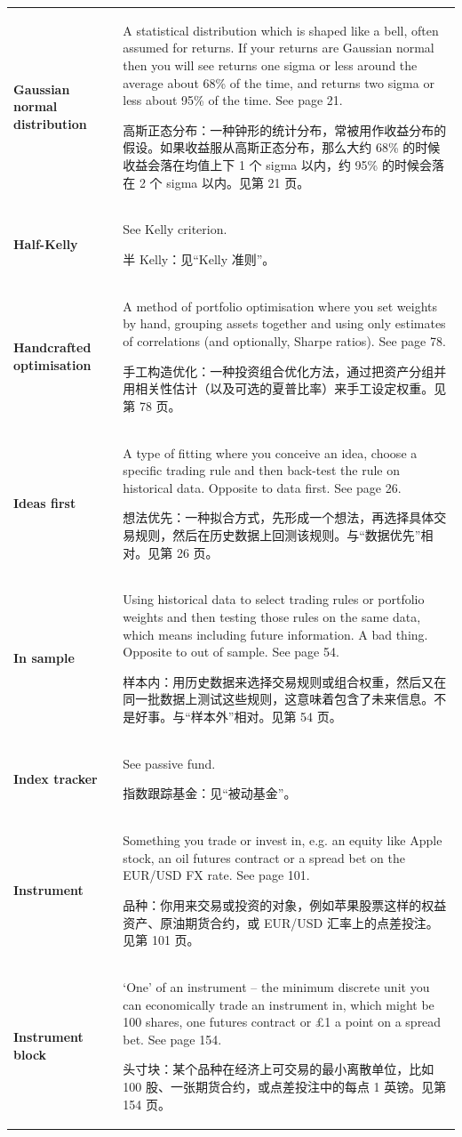 \begin{chinesetableblock}
{\begin{longtable}{@{}>{\raggedright\arraybackslash\bfseries} p{}>{\raggedright\arraybackslash} p{}@{}}
Gaussian normal distribution & A statistical distribution which is shaped like a bell, often assumed for returns. If your returns are Gaussian normal then you will see returns one sigma or less around the average about 68\% of the time, and returns two sigma or less about 95\% of the time. See page 21. \par 高斯正态分布：一种钟形的统计分布，常被用作收益分布的假设。如果收益服从高斯正态分布，那么大约 68\% 的时候收益会落在均值上下 1 个 sigma 以内，约 95\% 的时候会落在 2 个 sigma 以内。见第 21 页。 \\[0.65em]
Half-Kelly & See Kelly criterion. \par 半 Kelly：见“Kelly 准则”。 \\[0.65em]
Handcrafted optimisation & A method of portfolio optimisation where you set weights by hand, grouping assets together and using only estimates of correlations (and optionally, Sharpe ratios). See page 78. \par 手工构造优化：一种投资组合优化方法，通过把资产分组并用相关性估计（以及可选的夏普比率）来手工设定权重。见第 78 页。 \\[0.65em]
Ideas first & A type of fitting where you conceive an idea, choose a specific trading rule and then back-test the rule on historical data. Opposite to data first. See page 26. \par 想法优先：一种拟合方式，先形成一个想法，再选择具体交易规则，然后在历史数据上回测该规则。与“数据优先”相对。见第 26 页。 \\[0.65em]
In sample & Using historical data to select trading rules or portfolio weights and then testing those rules on the same data, which means including future information. A bad thing. Opposite to out of sample. See page 54. \par 样本内：用历史数据来选择交易规则或组合权重，然后又在同一批数据上测试这些规则，这意味着包含了未来信息。不是好事。与“样本外”相对。见第 54 页。 \\[0.65em]
Index tracker & See passive fund. \par 指数跟踪基金：见“被动基金”。 \\[0.65em]
Instrument & Something you trade or invest in, e.g. an equity like Apple stock, an oil futures contract or a spread bet on the EUR/USD FX rate. See page 101. \par 品种：你用来交易或投资的对象，例如苹果股票这样的权益资产、原油期货合约，或 EUR/USD 汇率上的点差投注。见第 101 页。 \\[0.65em]
Instrument block & ‘One’ of an instrument – the minimum discrete unit you can economically trade an instrument in, which might be 100 shares, one futures contract or £1 a point on a spread bet. See page 154. \par 头寸块：某个品种在经济上可交易的最小离散单位，比如 100 股、一张期货合约，或点差投注中的每点 1 英镑。见第 154 页。 \\[0.65em]

\end{longtable}}
\end{chinesetableblock}
